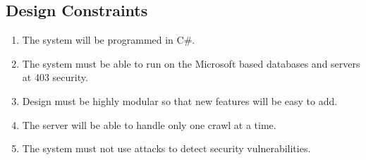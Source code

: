 \subsection{Design Constraints}
\begin{enumerate}
\item The system will be programmed in C\#.
\item The system must be able to run on the Microsoft based databases and servers at 403 security.
\item Design must be highly modular so that new features will be easy to add.
\item The server will be able to handle only one crawl at a time.
\item The system must not use attacks to detect security vulnerabilities.
\end{enumerate}
